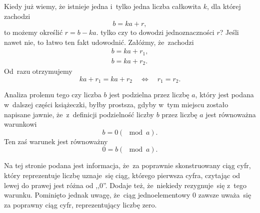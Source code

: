\documentclass[a4paper,11pt]{article}
\begin{document}
\vspace{\spaceFour}





 Kiedy już wiemy, że istnieje jedna i~tylko jedna liczba całkowita $k$, dla której
zachodzi 
\begin{equation}
  \label{eq:Gancarzewicz-Arytmetyka-04}
  b = k a + r,
\end{equation}
to możemy określić $r = b - k a$. tylko czy to dowodzi jednoznaczności $r$? Jeśli nawet nie,
to łatwo ten fakt udowodnić. Załóżmy, że~zachodzi
\begin{subequations}
  \begin{align}
    \label{eq:Gancarzewicz-Arytmetyka-05-A}
    b = k a + r_{ 1 }, \\
    \label{eq:Gancarzewicz-Arytmetyka-05-B}
    b = k a + r_{ 2 }.
  \end{align}
\end{subequations}
Od~razu otrzymujemy
\begin{equation}
  \label{eq:Gancarzewicz-Arytmetyka-06}
  k a + r_{ 1 } = k a + r_{ 2 } \quad \iff \quad r_{ 1 } = r_{ 2 }.
\end{equation}

\vspace{\spaceFour}





 Analiza prolemu tego czy liczba $b$ jest podzielna przez liczbę $a$, który
jest podana w~dalszej części książeczki, byłby prostsza, gdyby w~tym miejscu zostało 
napisane jawnie, że~z~definicji podzielność liczby $b$ przez liczbę $a$ jest równoważna warunkowi
\begin{equation}
  \label{eq:Gancarzewicz-Arytmetyka-07}
  b = 0 ( \mod a ).
\end{equation}
Ten zaś warunek jest równoważny
\begin{equation}
  \label{eq:Gancarzewicz-Arytmetyka-08}
  0 = b ( \mod a ).
\end{equation}

\vspace{\spaceFour}





 Na tej stronie podana jest informacja, że~za poprawnie skonstruowany ciąg cyfr, który
reprezentuje liczbę uznaje~się ciąg, którego pierwsza cyfra, czytając od lewej do prawej jest różna od ,,$0$''.
Dodaje też, że~niekiedy rezygnuje~się z~tego warunku. Pominięto jednak uwagę, że~ciąg jednoelementowy
$0$ zawsze uważa~się za poprawny ciąg cyfr, reprezentujący liczbę zero.
\end{document}

